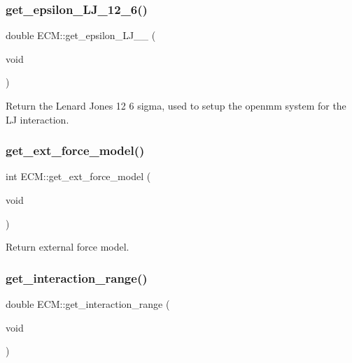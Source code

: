\subsubsection{\texorpdfstring{get\_epsilon\_LJ\_12\_6()}{get\_epsilon\_LJ\_12\_6()}}
{\footnotesize\ttfamily double E\+C\+M\+::get\+\_\+epsilon\+\_\+\+L\+J\+\_\+\_ (\begin{DoxyParamCaption}\item[{void}]{ }\end{DoxyParamCaption})\hspace{0.3cm}{\ttfamily [inline]}}

Return the Lenard Jones 12 6 sigma, used to setup the openmm system for the LJ interaction. \mbox{\label{classECM_a574b314f8234976b729ba5cc75b8c29c}} 
\subsubsection{\texorpdfstring{get\_ext\_force\_model()}{get\_ext\_force\_model()}}
{\footnotesize\ttfamily int E\+C\+M\+::get\+\_\+ext\+\_\+force\+\_\+model (\begin{DoxyParamCaption}\item[{void}]{ }\end{DoxyParamCaption})\hspace{0.3cm}{\ttfamily [inline]}}

Return external force model. \mbox{\label{classECM_af36525691755fc391410e3784fe44113}} 
\subsubsection{\texorpdfstring{get\_interaction\_range()}{get\_interaction\_range()}}
{\footnotesize\ttfamily double E\+C\+M\+::get\+\_\+interaction\+\_\+range (\begin{DoxyParamCaption}\item[{void}]{ }\end{DoxyParamCaption})\hspace{0.3cm}{\ttfamily [inline]}}

\mbox{\label{classECM_a61ec0379672113efba08c9b946e42c8a}} 
